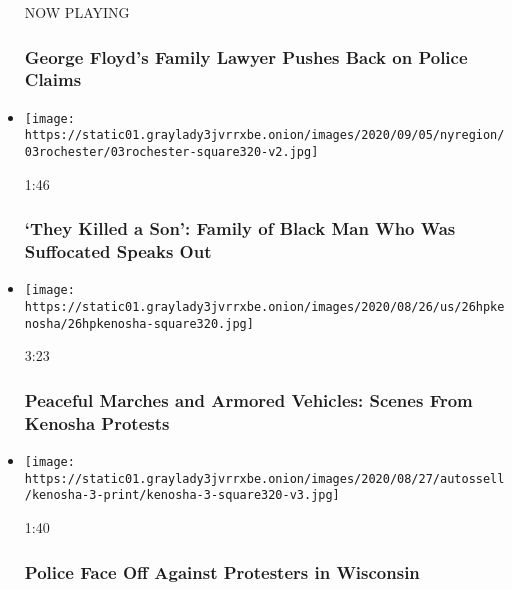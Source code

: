 \begin{itemize}
  NOW PLAYING

  \hypertarget{george-floyds-family-lawyer-pushes-back-on-police-claims-2}{%
  \subsubsection{George Floyd's Family Lawyer Pushes Back on Police
  Claims}\label{george-floyds-family-lawyer-pushes-back-on-police-claims-2}}
\item
  \href{https://www.nytimes3xbfgragh.onion/video/us/politics/100000007323016/daniel-prude-rochester-police-killing-video.html?action=click\&module=video-series-bar\&region=header\&pgtype=Article\&playlistId=video/dupont-race-policing}{}

  \texttt{[image: https://static01.graylady3jvrrxbe.onion/images/2020/09/05/nyregion/03rochester/03rochester-square320-v2.jpg]}

  1:46

  \hypertarget{they-killed-a-son-family-of-black-man-who-was-suffocated-speaks-out}{%
  \subsubsection{`They Killed a Son': Family of Black Man Who Was
  Suffocated Speaks
  Out}\label{they-killed-a-son-family-of-black-man-who-was-suffocated-speaks-out}}
\item
  \href{https://www.nytimes3xbfgragh.onion/video/us/100000007308488/kenosha-protests-video.html?action=click\&module=video-series-bar\&region=header\&pgtype=Article\&playlistId=video/dupont-race-policing}{}

  \texttt{[image: https://static01.graylady3jvrrxbe.onion/images/2020/08/26/us/26hpkenosha/26hpkenosha-square320.jpg]}

  3:23

  \hypertarget{peaceful-marches-and-armored-vehicles-scenes-from-kenosha-protests}{%
  \subsubsection{Peaceful Marches and Armored Vehicles: Scenes From
  Kenosha
  Protests}\label{peaceful-marches-and-armored-vehicles-scenes-from-kenosha-protests}}
\item
  \href{https://www.nytimes3xbfgragh.onion/video/us/100000007306119/kenosha-protests-jacob-blake-wisconsin-video.html?action=click\&module=video-series-bar\&region=header\&pgtype=Article\&playlistId=video/dupont-race-policing}{}

  \texttt{[image: https://static01.graylady3jvrrxbe.onion/images/2020/08/27/autossell/kenosha-3-print/kenosha-3-square320-v3.jpg]}

  1:40

  \hypertarget{police-face-off-against-protesters-in-wisconsin}{%
  \subsubsection{Police Face Off Against Protesters in
  Wisconsin}\label{police-face-off-against-protesters-in-wisconsin}}
\end{itemize}

